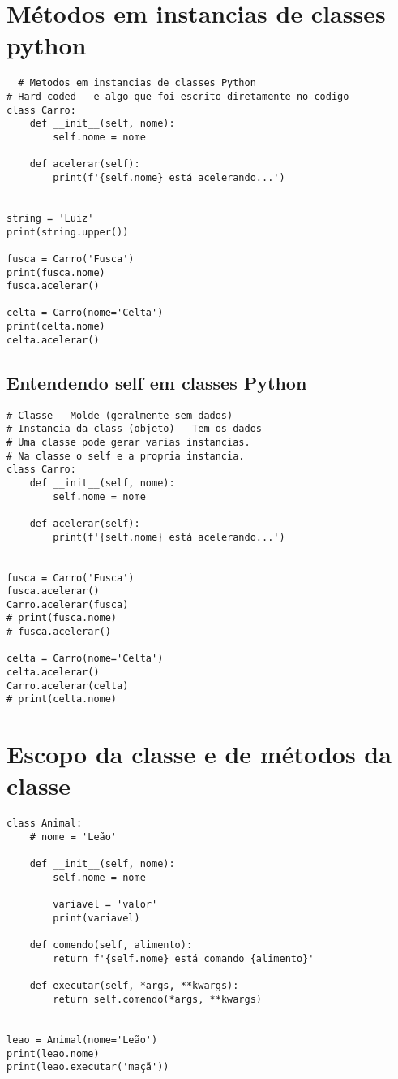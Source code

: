 \documentclass{article}
\begin{document}
\section{Métodos em instancias de classes python}
\begin{lstlisting}
  # Metodos em instancias de classes Python
# Hard coded - e algo que foi escrito diretamente no codigo
class Carro:
    def __init__(self, nome):
        self.nome = nome

    def acelerar(self):
        print(f'{self.nome} está acelerando...')


string = 'Luiz'
print(string.upper())

fusca = Carro('Fusca')
print(fusca.nome)
fusca.acelerar()

celta = Carro(nome='Celta')
print(celta.nome)
celta.acelerar()
\end{lstlisting}
\subsection{Entendendo self em classes Python}
\begin{lstlisting}
# Classe - Molde (geralmente sem dados)
# Instancia da class (objeto) - Tem os dados
# Uma classe pode gerar varias instancias.
# Na classe o self e a propria instancia.
class Carro:
    def __init__(self, nome):
        self.nome = nome

    def acelerar(self):
        print(f'{self.nome} está acelerando...')


fusca = Carro('Fusca')
fusca.acelerar()
Carro.acelerar(fusca)
# print(fusca.nome)
# fusca.acelerar()

celta = Carro(nome='Celta')
celta.acelerar()
Carro.acelerar(celta)
# print(celta.nome)
\end{lstlisting}
\section{Escopo da classe e de métodos da classe}
\begin{lstlisting}
class Animal:
    # nome = 'Leão'

    def __init__(self, nome):
        self.nome = nome

        variavel = 'valor'
        print(variavel)

    def comendo(self, alimento):
        return f'{self.nome} está comando {alimento}'

    def executar(self, *args, **kwargs):
        return self.comendo(*args, **kwargs)


leao = Animal(nome='Leão')
print(leao.nome)
print(leao.executar('maçã'))
\end{lstlisting}
\end{document}
